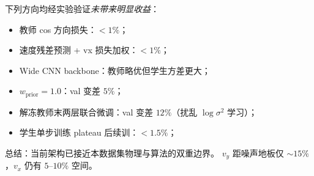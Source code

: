 \documentclass[11pt,a4paper]{ctexart}
\begin{document}
下列方向均经实验验证\textit{未带来明显收益}：
\begin{itemize}
  \item 教师 cos 方向损失：$<1\%$；
  \item 速度残差预测 + vx 损失加权：$<1\%$；
  \item Wide CNN backbone：教师略优但学生方差更大；
  \item $w_{\text{prior}}=1.0$：val 变差 $5\%$；
  \item 解冻教师末两层联合微调：val 变差 $12\%$（扰乱 $\log\sigma^2$ 学习）；
  \item 学生单步训练 plateau 后续训：$<1.5\%$；
\end{itemize}

总结：当前架构已接近本数据集物理与算法的双重边界。
$v_y$ 距噪声地板仅 $\sim 15\%$，$v_x$ 仍有 $5\text{--}10\%$ 空间。
\end{document}
